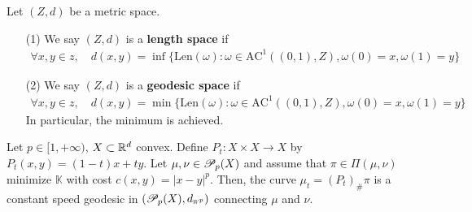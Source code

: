 \documentclass[12pt,a4paper]{article}
\begin{document}
 Let $(Z, d)$ be a metric space.
\begin{itemize}
\item[(1)] We say $(Z, d)$ is a \textbf{length space} if
\begin{align*}
\forall x, y\in z, \quad d(x,y) = \inf \{\text{Len}(\omega) : \omega \in \text{AC}^1((0, 1),Z), \omega(0)=x, \omega(1) =y \}
\end{align*}
\item[(2)] We say $(Z,d)$ is a \textbf{geodesic space} if
\begin{align*}
\forall x, y\in z, \quad d(x,y) = \min \{\text{Len}(\omega) : \omega \in \text{AC}^1((0, 1),Z), \omega(0)=x, \omega(1) =y \}
\end{align*}
In particular, the minimum is achieved.
\end{itemize}
\s

 Let $p\in [1, +\infty)$, $X\subset \mathbb{R}^d$ convex. Define $P_t : X\times X \rightarrow X$ by $P_t(x,y) = (1-t) x+ty$. Let $\mu, \nu \in \mathscr{P}_p(X)$ and assume that $\pi \in \Pi(\mu, \nu)$ minimize $\mathbb{K}$ with cost $c(x,y) = |x-y|^p$. Then, the curve $\mu_t = (P_t)_{\#} \pi$ is a constant speed geodesic in $(\PP_p(X), \wa{p})$ connecting $\mu$ and $\nu$.
\end{document}
